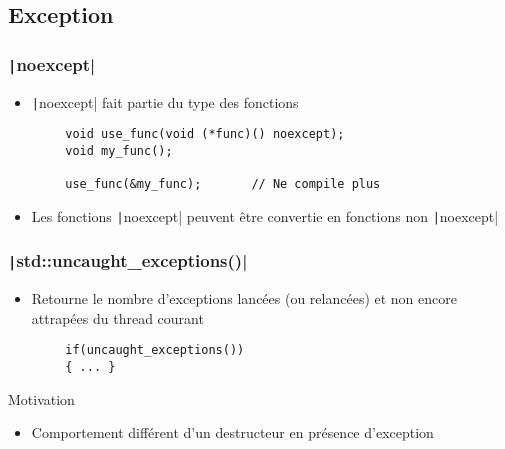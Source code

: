 \documentclass[C++.tex]{subfiles}
\begin{document}
\subsection*{Exception}
\begin{frame}[fragile]
	\frametitle{\texttt|noexcept|}
	\begin{itemize}
		\item \texttt|noexcept| fait partie du type des fonctions
	\end{itemize}

	\begin{verbatim}
		void use_func(void (*func)() noexcept);
		void my_func();

		use_func(&my_func);       // Ne compile plus
	\end{verbatim}


	\begin{itemize}
		\item Les fonctions \texttt|noexcept| peuvent être convertie en fonctions non \texttt|noexcept|
	\end{itemize}

\end{frame}

\begin{frame}[fragile]
	\frametitle{\texttt|std::uncaught_exceptions()|}
	\begin{itemize}
		\item Retourne le nombre d'exceptions lancées (ou relancées) et non encore attrapées du thread courant
	\end{itemize}

	\begin{verbatim}
		if(uncaught_exceptions())
		{ ... }
	\end{verbatim}

	\begin{block}{Motivation}
		\begin{itemize}
			\item Comportement différent d'un destructeur en présence d'exception
		\end{itemize}
	\end{block}

\end{frame}
\end{document}
